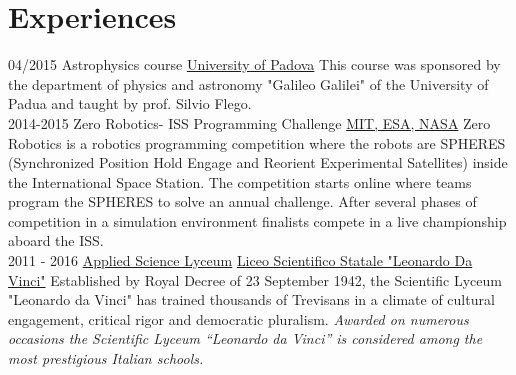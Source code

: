 \documentclass[]{friggeri-cv}
\begin{document}
\section{Experiences}
    \begin{entrylist} 
    \entry
    {04/2015}
    {Astrophysics course}
    {\href{http://www.dfa.unipd.it/}{University of Padova}}
    {This course was sponsored by the department of physics and astronomy "Galileo Galilei" of the University of Padua and taught by prof. Silvio Flego. \\} 
    \entry
    {2014-2015}
    {Zero Robotics- ISS Programming Challenge}
    { \href{http://zerorobotics.mit.edu/}{MIT, ESA, NASA}}
    {Zero Robotics is a robotics programming competition where the robots are SPHERES (Synchronized Position Hold Engage and Reorient Experimental Satellites) inside the International Space Station. The competition starts online where teams program the SPHERES to solve an annual challenge. After several phases of competition in a simulation environment finalists compete in a live championship aboard the ISS.\\}
    \entry
    {2011 - 2016}
    {\href{https://1drv.ms/b/s!Ap_mQ71ue930qnSZIBbkjV82or3Z}{Applied Science Lyceum}}
    { \href{http://www.liceodavinci.tv/sitoLiceo/index.php/}{Liceo Scientifico Statale "Leonardo Da Vinci"}}
    {Established by Royal Decree of 23 September 1942, the Scientific Lyceum "Leonardo da Vinci" has trained thousands of Trevisans in a climate of cultural engagement, critical rigor and democratic pluralism. 
    \emph{Awarded on numerous occasions the Scientific Lyceum “Leonardo da Vinci” is considered among the most prestigious Italian schools.}\\}
\end{entrylist}
\end{document}
